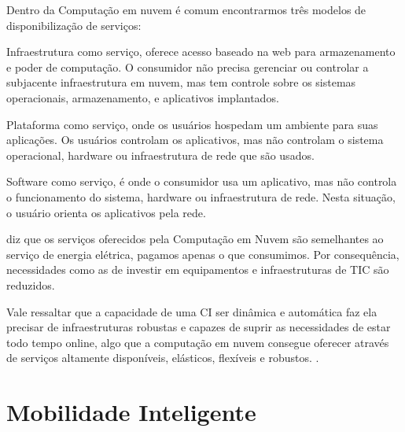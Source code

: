 Dentro da Computação em nuvem é comum encontrarmos três modelos de disponibilização de serviços: 

Infraestrutura como serviço, oferece acesso baseado na web para armazenamento e poder de computação. O consumidor não precisa gerenciar ou controlar a subjacente infraestrutura em nuvem, mas tem controle sobre os sistemas operacionais, armazenamento, e aplicativos implantados.

Plataforma como serviço, onde os usuários hospedam um
ambiente para suas aplicações. Os usuários controlam os aplicativos, mas não controlam o sistema operacional, hardware ou infraestrutura de rede que são usados.

Software como serviço, é onde o consumidor usa um aplicativo, mas não controla o funcionamento do sistema, hardware ou infraestrutura de rede. Nesta situação, o usuário orienta os aplicativos pela rede. 

 diz que os serviços oferecidos pela Computação em Nuvem são semelhantes ao serviço de energia elétrica, pagamos apenas o que consumimos. Por consequência, necessidades como as de investir em equipamentos e infraestruturas de TIC são reduzidos.



Vale ressaltar que a capacidade de uma CI ser dinâmica e automática faz ela precisar de infraestruturas robustas e capazes de suprir as necessidades de estar todo tempo online, algo que a computação em nuvem consegue oferecer através de serviços altamente disponíveis, elásticos, flexíveis e robustos. \cite{kon-cloud}.


\section{Mobilidade Inteligente}

